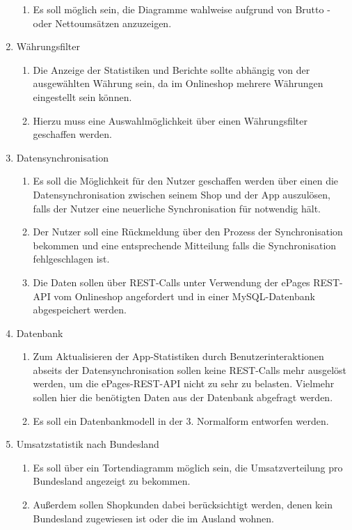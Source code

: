 \begin{enumerate}
\begin{enumerate}
\item Es soll möglich sein, die Diagramme wahlweise aufgrund von Brutto - oder Nettoumsätzen anzuzeigen.
\end{enumerate}
\item Währungsfilter
\begin{enumerate}
\item Die Anzeige der Statistiken und Berichte sollte abhängig von der  ausgewählten Währung sein, da im Onlineshop mehrere Währungen eingestellt sein können.
\item Hierzu muss eine Auswahlmöglichkeit über einen Währungsfilter geschaffen werden.
\end{enumerate}
\item Datensynchronisation
\begin{enumerate}
\item Es soll die Möglichkeit für den Nutzer geschaffen werden über einen  die Datensynchronisation zwischen seinem Shop und der App auszulösen, falls der Nutzer eine neuerliche Synchronisation für notwendig hält.
\item Der Nutzer soll eine Rückmeldung über den Prozess der Synchronisation bekommen und eine entsprechende Mitteilung falls die Synchronisation fehlgeschlagen ist.
\item Die Daten sollen über REST-Calls unter Verwendung der ePages REST-API vom Onlineshop angefordert und in einer MySQL-Datenbank abgespeichert werden.
\end{enumerate}
\item Datenbank
\begin{enumerate}
\item Zum Aktualisieren der App-Statistiken durch Benutzerinteraktionen abseits der Datensynchronisation sollen keine REST-Calls mehr ausgelöst werden, um die ePages-REST-API nicht zu sehr zu belasten. Vielmehr sollen hier die benötigten Daten aus der Datenbank abgefragt werden.
\item Es soll ein Datenbankmodell in der 3. Normalform entworfen werden.
\end{enumerate}
\item Umsatzstatistik nach Bundesland
\begin{enumerate}
\item Es soll über ein Tortendiagramm möglich sein, die Umsatzverteilung pro Bundesland angezeigt zu bekommen.
\item Außerdem sollen Shopkunden dabei berücksichtigt werden, denen kein Bundesland zugewiesen ist oder die im Ausland wohnen.

\end{enumerate}
\end{enumerate}

